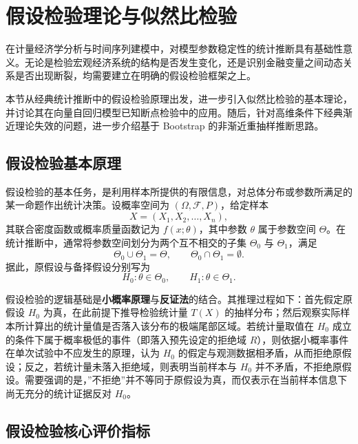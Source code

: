 
\section{假设检验理论与似然比检验}

在计量经济学分析与时间序列建模中，对模型参数稳定性的统计推断具有基础性意义。无论是检验宏观经济系统的结构是否发生变化，还是识别金融变量之间动态关系是否出现断裂，均需要建立在明确的假设检验框架之上。

本节从经典统计推断中的假设检验原理出发，进一步引入似然比检验的基本理论，并讨论其在向量自回归模型已知断点检验中的应用。随后，针对高维条件下经典渐近理论失效的问题，进一步介绍基于 Bootstrap 的非渐近重抽样推断思路。

\subsection{假设检验基本原理}

假设检验的基本任务，是利用样本所提供的有限信息，对总体分布或参数所满足的某一命题作出统计决策。设概率空间为 $(\Omega,\mathcal{F},P)$，给定样本
\begin{equation}
X=(X_1,X_2,\dots,X_n),
\end{equation}
其联合密度函数或概率质量函数记为 $f(x;\theta)$，其中参数 $\theta$ 属于参数空间 $\Theta$。在统计推断中，通常将参数空间划分为两个互不相交的子集 $\Theta_0$ 与 $\Theta_1$，满足
\begin{equation}
\Theta_0\cup\Theta_1=\Theta, \qquad \Theta_0\cap\Theta_1=\emptyset.
\end{equation}
据此，原假设与备择假设分别写为
\begin{equation}
H_0: \theta\in\Theta_0, \qquad H_1: \theta\in\Theta_1.
\end{equation}

假设检验的逻辑基础是\textbf{小概率原理}与\textbf{反证法}的结合。其推理过程如下：首先假定原假设 $H_0$ 为真，在此前提下推导检验统计量 $T(X)$ 的抽样分布；然后观察实际样本所计算出的统计量值是否落入该分布的极端尾部区域。若统计量取值在 $H_0$ 成立的条件下属于概率极低的事件（即落入预先设定的拒绝域 $R$），则依据小概率事件在单次试验中不应发生的原理，认为 $H_0$ 的假定与观测数据相矛盾，从而拒绝原假设；反之，若统计量未落入拒绝域，则表明当前样本与 $H_0$ 并不矛盾，不拒绝原假设。需要强调的是，”不拒绝”并不等同于原假设为真，而仅表示在当前样本信息下尚无充分的统计证据反对 $H_0$。

\subsection{假设检验核心评价指标}

